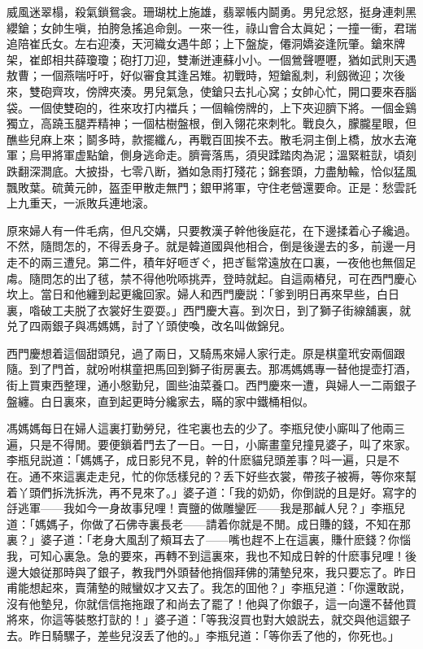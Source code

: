 \begin{myquote}
威風迷翠榻，殺氣鎖鴛衾。珊瑚枕上施雄，翡翠帳内鬬勇。男兒忿怒，挺身連刺黑纓鎗；女帥生嗔，拍胯急搖追命劍。一來一徃，祿山會合太眞妃；一撞一衝，君瑞追陪崔氏女。左右迎湊，天河織女遇牛郎；上下盤旋，僊洞嬌姿逢阮肇。鎗來牌架，崔郎相共薛瓊瓊；砲打刀迎，雙漸迸連蘇小小。一個鶯聲嚦嚦，猶如武則天遇敖曹；一個燕喘吁吁，好似審食其逢呂雉。初戰時，短鎗亂刺，利劔微迎；次後來，雙砲齊攻，傍牌夾湊。男兒氣急，使鎗只去扎心窝；女帥心忙，開口要來吞腦袋。一個使雙砲的，徃來攻打内襠兵；一個輪傍牌的，上下夾迎臍下將。一個金鷄獨立，高蹺玉腿弄精神；一個枯樹盤根，倒入翎花來刺牝。戰良久，朦朧星眼，但醮些兒麻上來；鬬多時，款擺纖ん，再戰百囬挨不去。散毛洞主倒上橋，放水去淹軍；烏甲將軍虚點鎗，側身逃命走。臍膏落馬，須臾蹂踏肉為泥；溫緊粧獃，頃刻跌翻深澗底。大披掛，七零八断，猶如急雨打殘花；錦套頭，力盡觔輸，恰似猛風飄敗葉。硫黄元帥，盔歪甲散走無門；銀甲將軍，守住老營還要命。正是：愁雲託上九重天，一派敗兵連地滚。
\end{myquote}

原來婦人有一件毛病，但凡交媾，只要教漢子幹他後庭花，在下邊揉着心子纔過。不然，隨問怎的，不得丢身子。就是韓道國與他相合，倒是後邊去的多，前邊一月走不的兩三遭兒。第二件，積年好咂ぎぐ，把ぎ䯲常遠放在口裏，一夜他也無個足䖏。隨問怎的出了毧，禁不得他吮㖭挑弄，登時就起。自這兩樁兒，可在西門慶心坎上。當日和他纏到起更纔回家。婦人和西門慶説：「爹到明日再來早些，白日裏，喒破工夫脱了衣裳好生耍耍。」西門慶大喜。到次日，到了獅子街線舖裏，就兑了四兩銀子與馮媽媽，討了丫頭使喚，改名叫做錦兒。

西門慶想着這個甜頭兒，過了兩日，又騎馬來婦人家行走。原是棋童玳安兩個跟隨。到了門首，就吩咐棋童把馬回到獅子街房裏去。那馮媽媽專一替他提壶打酒，街上買東西整理，通小慇勤兒，圖些油菜養口。西門慶來一遭，與婦人一二兩銀子盤纏。白日裏來，直到起更時分纔家去，瞞的家中鐵桶相似。

馮媽媽每日在婦人這裏打勤勞兒，徃宅裏也去的少了。李瓶兒使小廝叫了他兩三遍，只是不得閒。要便鎖着門去了一日。一日，小廝畫童兒撞見婆子，叫了來家。李瓶兒説道：「媽媽子，成日影兒不見，幹的什麽貓兒頭差事？呌一遍，只是不在。通不來這裏走走兒，忙的你恁樣兒的？丢下好些衣裳，帶孩子被褥，等你來幫着丫頭們拆洗拆洗，再不見來了。」婆子道：「我的奶奶，你倒説的且是好。寫字的㧱逃軍——我如今一身故事兒哩！賣鹽的做雕鑾匠——我是那鹹人兒？」李瓶兒道：「媽媽子，你做了石佛寺裏長老——請着你就是不閒。成日賺的錢，不知在那裏？」婆子道：「老身大風刮了頰耳去了——嘴也趕不上在這裏，賺什麽錢？你惱我，可知心裏急。急的要來，再轉不到這裏來，我也不知成日幹的什麽事兒哩！後邊大娘従那時與了銀子，教我門外頭替他捎個拜佛的蒲墊兒來，我只要忘了。昨日甫能想起來，賣蒲墊的賊蠻奴才又去了。我怎的囬他？」李瓶兒道：「你還敢説，沒有他墊兒，你就信信拖拖跟了和尚去了罷了！他與了你銀子，這一向還不替他買將來，你這等裝憨打獃的！」婆子道：「等我沒買也對大娘説去，就交與他這銀子去。昨日騎騾子，差些兒沒丢了他的。」李瓶兒道：「等你丢了他的，你死也。」

